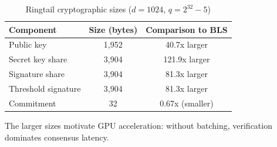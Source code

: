 \begin{table}[h]
\centering
\begin{tabular}{lcc}
\toprule
\textbf{Component} & \textbf{Size (bytes)} & \textbf{Comparison to BLS} \\
\midrule
Public key & 1,952 & 40.7x larger \\
Secret key share & 3,904 & 121.9x larger \\
Signature share & 3,904 & 81.3x larger \\
Threshold signature & 3,904 & 81.3x larger \\
Commitment & 32 & 0.67x (smaller) \\
\bottomrule
\end{tabular}
\caption{Ringtail cryptographic sizes ($d = 1024$, $q = 2^{32} - 5$)}
\label{tab:ringtail-sizes}
\end{table}

The larger sizes motivate GPU acceleration: without batching, \Ringtail{} verification dominates consensus latency.

